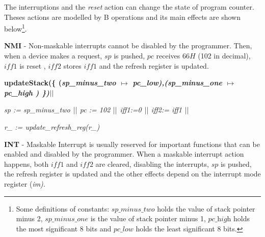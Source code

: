 \documentclass[a4paper]{llncs}
\begin{document}
The interruptions and the \textit{reset} action can change the state of
program counter. Theses actions are modelled by B operations and its main
effects are shown below\footnote{Some definitions of constants: $\textit{sp\_minus\_two}$ holds the value of stack pointer minus 2,
 $\textit{sp\_minus\_one}$ is the value of stack pointer minus 1,
$\textit{pc\_high}$ holds the most significant 8 bits and
$\textit{pc\_low}$ holds the least significant 8 bits.}.


 \textbf{NMI} - Non-maskable interrupts cannot be disabled
 by the programmer. Then, when a device makes a request, $sp$ is pushed,
 $pc$ receives $66H$ (102 in decimal), $\textit{iff1}$ is reset , $\textit{iff2}$ stores
 $\textit{iff1}$ and the refresh register is updated.
  
\begin{sloppypar}
\bf updateStack\rm (\rm \{ \rm (\it sp\_minus\_two  $\mapsto$  \it pc\_low\rm )\rm ,\rm (\it sp\_minus\_one  $\mapsto$ \it pc\_high \rm ) \rm \}\rm )$\mbox{$\mid\mid$}$

\it sp \rm := \it sp\_minus\_two  $\mbox{$\mid\mid$}$ \it pc \rm := \rm 1\rm 0\rm 2 $\mbox{$\mid\mid$}$ \it iff1\rm :=\rm 0  $\mbox{$\mid\mid$}$  \it iff2\rm := \it iff1 $\mbox{$\mid\mid$}$

\it r\_ \rm := \it update\_refresh\_reg\rm (\it r\_\rm )\\
\end{sloppypar}

  \textbf{INT} - Maskable Interrupt is usually reserved for important functions that can be enabled and
  disabled by the programmer. When a maskable interrupt action happens, both $\textit{iff1}$ and $\textit{iff2}$ are
  cleared, disabling the interrupts, $sp$ is pushed, the refresh register is updated and the other effects
  depend on the interrupt mode register (\it im\rm).
 
\end{document}
